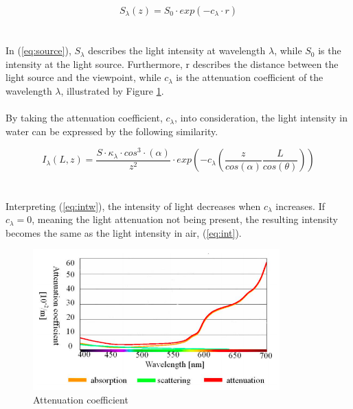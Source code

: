 \begin{equation} \label{eq:source}
S_{\lambda} (z) = S_0 \cdot exp (-c_{\lambda} \cdot r)
\end{equation}
\\\\
In (\ref{eq:source}), $S_{\lambda}$ describes the light intensity at wavelength $\lambda$, while $S_0$ is the intensity at the light source. Furthermore, r describes the distance between the light source and the viewpoint, while $c_{\lambda}$ is the attenuation coefficient of the wavelength $\lambda$, illustrated by Figure \ref{fig:attcoeff}.
\\\\
By taking the attenuation coefficient, $c_{\lambda}$, into consideration, the light intensity in water can be expressed by the following similarity. 

\begin{equation} \label{eq:intw}
    I_ {\lambda} (L, z) = \frac{S \cdot \kappa_{\lambda}\cdot cos^{3}\cdot (\alpha)}{z^2} \cdot exp \left(-c_{\lambda}\left(\frac{z}{cos(\alpha)}\frac{L}{cos(\theta)}\right)\right)
\end{equation}
\\\\
Interpreting (\ref{eq:intw}), the intensity of light decreases when $c_{\lambda}$ increases. If $c_{\lambda} = 0$, meaning the light attenuation not being present, the resulting intensity becomes the same as the light intensity in air, (\ref{eq:int}). 

\begin{figure}[H]
\centering
  \includegraphics[width=9.5cm]{Images/theory/attcoeff.png}
  \caption{Attenuation coefficient}
  \label{fig:attcoeff}
\end{figure}




